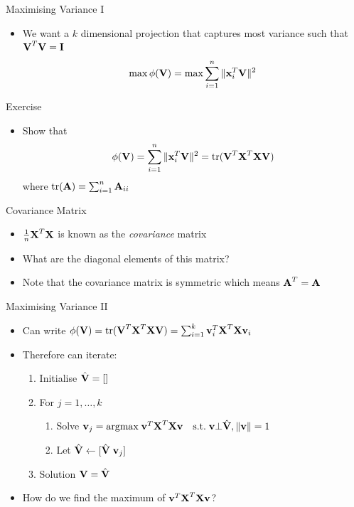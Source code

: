 \documentclass{beamer}
\begin{document}
\begin{frame}{Maximising Variance I}
\begin{itemize}
 \item We want a $k$ dimensional projection that captures most variance such that $\textbf{V}^T\textbf{V} = \textbf{I}$
 \begin{displaymath}
  \max \phi(\textbf{V}) = \max \sum_{i=1}^n \|\textbf{x}_{i}^T\textbf{V} \|^2
 \end{displaymath}
\end{itemize}
\end{frame}

\begin{frame}{Exercise}  
\begin{itemize}
 \item Show that 
 \begin{displaymath} 
 \phi(\textbf{V}) = \sum_{i=1}^n \|\textbf{x}_{i}^T\textbf{V} \|^2 = \mbox{tr}(\textbf{V}^T\textbf{X}^T\textbf{X}\textbf{V}) 
 \end{displaymath}
 where $\mbox{tr}(\textbf{A}) = \sum_{i=1}^n \textbf{A}_{ii}$
\end{itemize}

\end{frame}


\begin{frame}{Covariance Matrix}
\begin{itemize} 
 \item $\frac{1}{n}\textbf{X}^T\textbf{X}$ is known as the \emph{covariance} matrix 
 \item What are the diagonal elements of this matrix? 
 \item Note that the covariance matrix is symmetric which means $\textbf{A}^T = \textbf{A}$
\end{itemize}
\end{frame}

\begin{frame}{Maximising Variance II} 
\begin{itemize} 
 \item Can write $\phi(\textbf{V}) = \mbox{tr}(\textbf{V}^T\textbf{X}^T\textbf{X}\textbf{V}) = \sum_{i=1}^k \textbf{v}_i^T\textbf{X}^T\textbf{X}\textbf{v}_i$
 \item Therefore can iterate:
 \begin{enumerate}
  \item Initialise $\hat{\textbf{V}} = []$
  \item For $j = 1, \ldots, k$
  \begin{enumerate}
  \item Solve $\textbf{v}_j = \mbox{argmax} \; \textbf{v}^T\textbf{X}^T\textbf{X}\textbf{v} \quad \mbox{s.t.} \;  \textbf{v} \bot \hat{\textbf{V}}, \|\textbf{v} \|  = 1$
  \item Let $\hat{\textbf{V}} \leftarrow [\hat{\textbf{V}} \; \textbf{v}_{j}]$
   \end{enumerate}
\item Solution $\textbf{V} = \hat{\textbf{V}}$
 \end{enumerate}
\item How do we find the maximum of $\textbf{v}^T\textbf{X}^T\textbf{X}\textbf{v}$? 
\end{itemize}
\end{frame}
\end{document}
